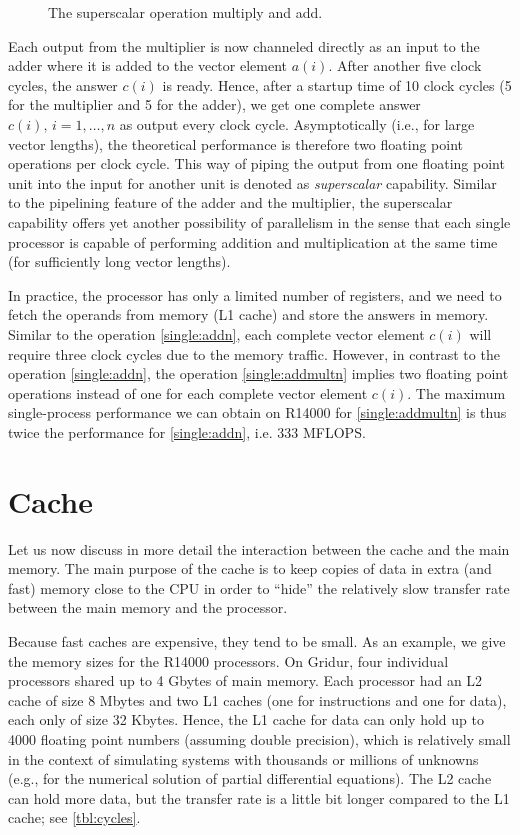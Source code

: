 \begin{figure}[htbp]
  \centering
  
  \caption{The superscalar operation multiply and add.}
  \label{fig:SuperScalar}
\end{figure}

Each output from the multiplier is now channeled directly as an input to the
adder where it is added to the vector element $a(i)$. After another five clock
cycles, the answer $c(i)$ is ready. Hence, after a startup time of 10 clock
cycles (5 for the multiplier and 5 for the adder), we get one complete answer
$c(i), \, i=1,\ldots,n$ as output every clock cycle. Asymptotically (i.e., for
large vector lengths), the theoretical performance is therefore two floating
point operations per clock cycle. This way of piping the output from one
floating point unit into the input for another unit is denoted as
\emph{superscalar} capability. Similar to the pipelining feature of the adder
and the multiplier, the superscalar capability offers yet another possibility of
parallelism in the sense that each single processor is capable of performing
addition and multiplication at the same time (for sufficiently long vector
lengths).

In practice, the processor has only a limited number of registers, and we need
to fetch the operands from memory (L1 cache) and store the answers in memory.
Similar to the operation \eqref{single:addn}, each complete vector element
$c(i)$ will require three clock cycles due to the memory traffic. However, in
contrast to the operation \eqref{single:addn}, the operation
\eqref{single:addmultn} implies two floating point operations instead of one for
each complete vector element $c(i)$. The maximum single-process performance we
can obtain on R14000 for \eqref{single:addmultn} is thus twice the performance
for \eqref{single:addn}, i.e. 333 MFLOPS.

\section{Cache}

Let us now discuss in more detail the interaction between the cache and the main
memory. The main purpose of the cache is to keep copies of data in extra (and
fast) memory close to the CPU in order to ``hide'' the relatively slow transfer
rate between the main memory and the processor.

Because fast caches are expensive, they tend to be small. As an example, we give
the memory sizes for the R14000 processors. On Gridur, four individual
processors shared up to 4 Gbytes of main memory. Each processor had an L2 cache
of size 8 Mbytes and two L1 caches (one for instructions and one for data), each
only of size 32 Kbytes. Hence, the L1 cache for data can only hold up to 4000
floating point numbers (assuming double precision), which is relatively small in
the context of simulating systems with thousands or millions of unknowns (e.g.,
for the numerical solution of partial differential equations). The L2 cache can
hold more data, but the transfer rate is a little bit longer compared to the L1
cache; see \autoref{tbl:cycles}.

